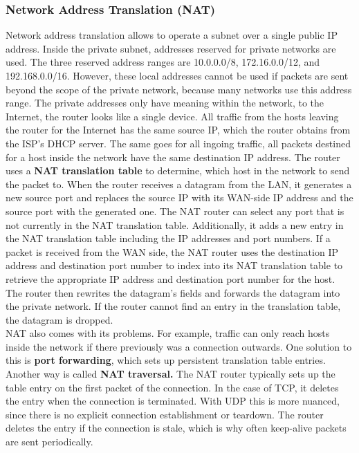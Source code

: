 \subsubsection{Network Address Translation (NAT)}
Network address translation allows to operate a subnet over a single public IP address. Inside the private subnet, addresses reserved for private networks are used. The three reserved address ranges are 10.0.0.0/8, 172.16.0.0/12, and 192.168.0.0/16. However, these local addresses cannot be used if packets are sent beyond the scope of the private network, because many networks use this address range. The private addresses only have meaning within the network, to the Internet, the router looks like a single device. All traffic from the hosts leaving the router for the Internet has the same source IP, which the router obtains from the ISP's DHCP server. The same goes for all ingoing traffic, all packets destined for a host inside the network have the same destination IP address. The router uses a \textbf{NAT translation table} to determine, which host in the network to send the packet to. When the router receives a datagram from the LAN, it generates a new source port and replaces the source IP with its WAN-side IP address and the source port with the generated one. The NAT router can select any port that is not currently in the NAT translation table. Additionally, it adds a new entry in the NAT translation table including the IP addresses and port numbers. If a packet is received from the WAN side, the NAT router uses the destination IP address and destination port number to index into its NAT translation table to retrieve the appropriate IP address and destination port number for the host. The router then rewrites the datagram's fields and forwards the datagram into the private network. If the router cannot find an entry in the translation table, the datagram is dropped.\vspace{.3cm}\\

NAT also comes with its problems. For example, traffic can only reach hosts inside the network if there previously was a connection outwards. One solution to this is \textbf{port forwarding}, which sets up persistent translation table entries. Another way is called \textbf{NAT traversal.} The NAT router typically sets up the table entry on the first packet of the connection. In the case of TCP, it deletes the entry when the connection is terminated. With UDP this is more nuanced, since there is no explicit connection establishment or teardown. The router deletes the entry if the connection is stale, which is why often keep-alive packets are sent periodically.

